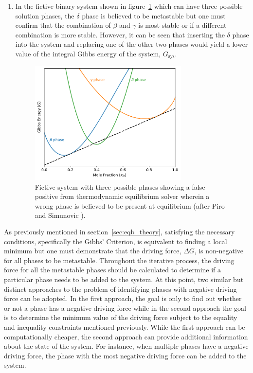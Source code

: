 \begin{enumerate}
	\item In the fictive binary system shown in figure~\ref{fig:go_sys-CD} which can have three possible solution phases, the $\delta$ phase is believed to be metastable but one must confirm that the combination of $\beta$ and $\gamma$ is most stable or if a different combination is more stable. However, it can be seen that inserting the $\delta$ phase into the system and replacing one of the other two phases would yield a lower value of the integral Gibbs energy of the system, $G_\text{sys}$.
		\begin{figure}[htbp]
			\centering
			\includegraphics[width=0.75\textwidth]{figures/chapter-4/System_CD.pdf}
			\caption[Fictive system with three possible phases showing a false positive from thermodynamic equilibrium solver wherein a wrong phase is believed to be present at equilibrium.]{Fictive system with three possible phases showing a false positive from thermodynamic equilibrium solver wherein a wrong phase is believed to be present at equilibrium (after Piro and Simunovic \cite{Piro16}).}
			\label{fig:go_sys-CD}
		\end{figure}
	\end{enumerate}

As previously mentioned in section~\ref{sec:eqb_theory}, satisfying the necessary conditions, specifically the Gibbs' Criterion, is equivalent to finding a local minimum but one must demonstrate that the driving force, $\Delta G$, is non-negative for all phases to be metastable. Throughout the iterative process, the driving force for all the metastable phases should be calculated to determine if a particular phase needs to be added to the system. At this point, two similar but distinct approaches to the problem of identifying phases with negative driving force can be adopted. In the first approach, the goal is only to find out whether or not a phase has a negative driving force while in the second approach the goal is to determine the minimum value of the driving force subject to the equality and inequality constraints mentioned previously. While the first approach can be computationally cheaper, the second approach can provide additional information about the state of the system. For instance, when multiple phases have a negative driving force, the phase with the most negative driving force can be added to the system. 

